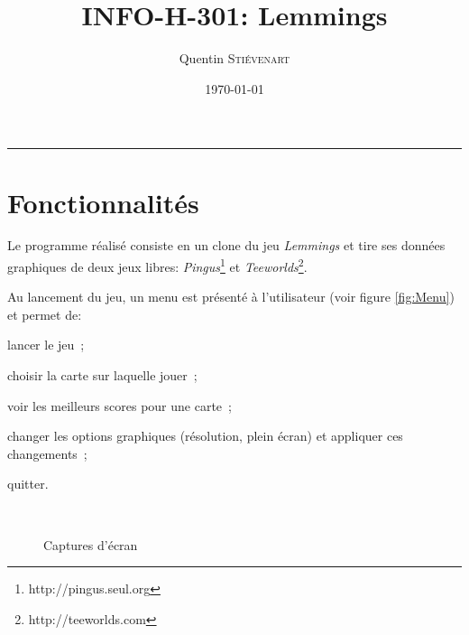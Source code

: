 \documentclass[a4paper,12pt]{article}
\title{INFO-H-301: Lemmings}
\author{Quentin \textsc{Stiévenart}}
\date{\today}
\newcommand{\HRule}{\rule{\linewidth}{0.5mm}}
\begin{document}
\maketitle

\HRule

\section{Fonctionnalités}

Le programme réalisé consiste en un clone du jeu \emph{Lemmings} et
tire ses données graphiques de deux jeux libres:
\emph{Pingus}\footnote{http://pingus.seul.org} et
\emph{Teeworlds}\footnote{http://teeworlds.com}.

Au lancement du jeu, un menu est présenté à l'utilisateur (voir figure
\ref{fig:Menu}) et permet de:
\begin{list}{-}{}
  \item lancer le jeu~;
  \item choisir la carte sur laquelle jouer~;
  \item voir les meilleurs scores pour une carte~;
  \item changer les options graphiques (résolution, plein écran) et
    appliquer ces changements~;
  \item quitter.
\end{list}


\begin{figure}[ht!]
  \centering
  ~~~~~~
  \caption{Captures d'écran}
\end{figure}
\end{document}
